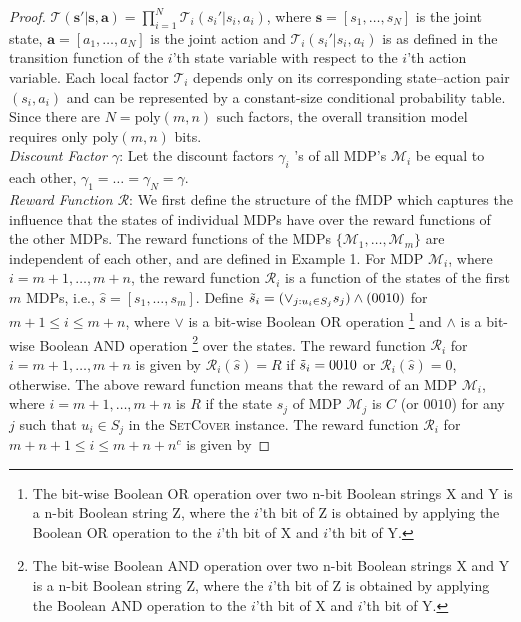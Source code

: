\documentclass[twocolumn]{autart}    %
\begin{document}
\begin{proof}
$ \mathcal{T}(\mathbf{s'} | \mathbf{s}, \mathbf{a} ) = \prod_{i = 1}^{N} \mathcal{T}_i(s_i' | s_i, a_i )$,
 where $\mathbf{s} = [s_1, \hdots, s_N]$ is the joint state, $\mathbf{a} = [a_1, \hdots, a_N]$ is the joint action and $\mathcal{T}_i(s_i' | s_i, a_i )$ is as defined in the transition function of the $i$'th state variable with respect to the $i$'th action variable. Each local factor $\mathcal{T}_i$ depends only on its corresponding state--action pair $(s_i, a_i)$ 
and can be represented by a constant-size conditional probability table. 
Since there are $N = \text{poly}(m,n)$ such factors, the overall transition model requires only 
$\text{poly}(m,n)$ bits.\\
\textit{Discount Factor $\gamma$}: Let the discount factors $\gamma_i$ 's of all MDP's $\mathcal{M}_i$ be equal to each other, $ \gamma_1 = \hdots = \gamma_N = \gamma.$\\
\textit{Reward Function $\mathcal{R}$}: 
We first define the structure of the fMDP which captures the influence that the states of individual MDPs have over the reward functions of the other MDPs. The reward functions of the MDPs $\{ \mathcal{M}_1, \hdots, \mathcal{M}_m \}$  are independent of each other, and are defined in Example 1. For MDP $\mathcal{M}_i$, where $i = m+1, \hdots, m+n$, the reward function $\mathcal{R}_i$ is a function of the states of the first $m$ MDPs, i.e., $\hat{s} = [s_1, \hdots, s_m]$. Define $\Tilde{s}_i =  (\vee_{j: u_i \in S_j} s_j) \wedge (0010)$ for $m+1 \leq i \leq m+n$, where $\vee$ is a bit-wise Boolean OR operation \footnote{The bit-wise Boolean  OR operation over two n-bit Boolean strings X and Y is a n-bit Boolean string Z, where the $i$'th bit of Z is obtained by applying the Boolean OR operation to the $i$'th bit of X and $i$'th bit of Y.} and $\wedge$ is a  bit-wise Boolean AND operation \footnote{The bit-wise Boolean AND operation over two n-bit Boolean strings X and Y is a n-bit Boolean string Z, where the $i$'th bit of Z is obtained by applying the Boolean AND operation to the $i$'th bit of X and $i$'th bit of Y.} over the states. The reward function $\mathcal{R}_i$ for $i = m+1, \hdots, m+n$ is given by
$\mathcal{R}_i(\hat{s})= 
        R$ if $\Tilde{s}_i = 0010$ or 
       $\mathcal{R}_i(\hat{s})= 0$, otherwise. 
The above reward function means that the reward of an MDP $\mathcal{M}_i$, where $i = m+1, \hdots, m+n$ is $R$ if the state $s_j$ of MDP $\mathcal{M}_j$ is $C$ (or $0010$) for any $j$ such that $u_i \in S_j$ in the \textsc{SetCover} instance. 
 The reward function $\mathcal{R}_i$ for $m+n+1 \leq i \leq m+n+n^c$ is given by

\end{proof}
\end{document}
